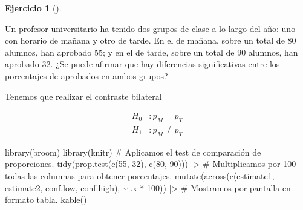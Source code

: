 \documentclass[
  a4paper,
]{scrreport}
\newenvironment{Shaded}{\begin{snugshade}}{\end{snugshade}}
\newcommand{\CommentTok}[1]{\textcolor[rgb]{0.37,0.37,0.37}{#1}}
\newcommand{\DecValTok}[1]{\textcolor[rgb]{0.68,0.00,0.00}{#1}}
\newcommand{\FunctionTok}[1]{\textcolor[rgb]{0.28,0.35,0.67}{#1}}
\newcommand{\NormalTok}[1]{\textcolor[rgb]{0.00,0.23,0.31}{#1}}
\newcommand{\SpecialCharTok}[1]{\textcolor[rgb]{0.37,0.37,0.37}{#1}}
\theoremstyle{definition}
\newtheorem{exercise}{Ejercicio}[chapter]
\theoremstyle{remark}
\begin{document}
\begin{exercise}[]\protect\hypertarget{exr-contraste-hipotesis-proporciones-aprobados}{}\label{exr-contraste-hipotesis-proporciones-aprobados}

Un profesor universitario ha tenido dos grupos de clase a lo largo del
año: uno con horario de mañana y otro de tarde. En el de mañana, sobre
un total de \(80\) alumnos, han aprobado \(55\); y en el de tarde, sobre
un total de \(90\) alumnos, han aprobado \(32\). ¿Se puede afirmar que
hay diferencias significativas entre los porcentajes de aprobados en
ambos grupos?

\begin{tcolorbox}[enhanced jigsaw, coltitle=black, left=2mm, colback=white, leftrule=.75mm, toptitle=1mm, breakable, bottomrule=.15mm, titlerule=0mm, bottomtitle=1mm, title=\textcolor{quarto-callout-tip-color}{\faLightbulb}\hspace{0.5em}{Solución}, arc=.35mm, toprule=.15mm, rightrule=.15mm, colframe=quarto-callout-tip-color-frame, opacityback=0, colbacktitle=quarto-callout-tip-color!10!white, opacitybacktitle=0.6]

Tenemos que realizar el contraste bilateral

\begin{align*}
H_0 &: p_M = p_T \\
H_1 &: p_M \neq p_T 
\end{align*}

\begin{Shaded}
\begin{Highlighting}[]
\FunctionTok{library}\NormalTok{(broom)}
\FunctionTok{library}\NormalTok{(knitr) }
\CommentTok{\# Aplicamos el test de comparación de proporciones.}
\FunctionTok{tidy}\NormalTok{(}\FunctionTok{prop.test}\NormalTok{(}\FunctionTok{c}\NormalTok{(}\DecValTok{55}\NormalTok{, }\DecValTok{32}\NormalTok{), }\FunctionTok{c}\NormalTok{(}\DecValTok{80}\NormalTok{, }\DecValTok{90}\NormalTok{))) }\SpecialCharTok{|\textgreater{}} 
    \CommentTok{\# Multiplicamos por 100 todas las columnas para obtener porcentajes.}
    \FunctionTok{mutate}\NormalTok{(}\FunctionTok{across}\NormalTok{(}\FunctionTok{c}\NormalTok{(estimate1, estimate2, conf.low, conf.high), }\SpecialCharTok{\textasciitilde{}}\NormalTok{ .x }\SpecialCharTok{*} \DecValTok{100}\NormalTok{)) }\SpecialCharTok{|\textgreater{}} 
    \CommentTok{\# Mostramos por pantalla en formato tabla.}
    \FunctionTok{kable}\NormalTok{()}
\end{Highlighting}
\end{Shaded}


\end{tcolorbox}
\end{exercise}
\end{document}
